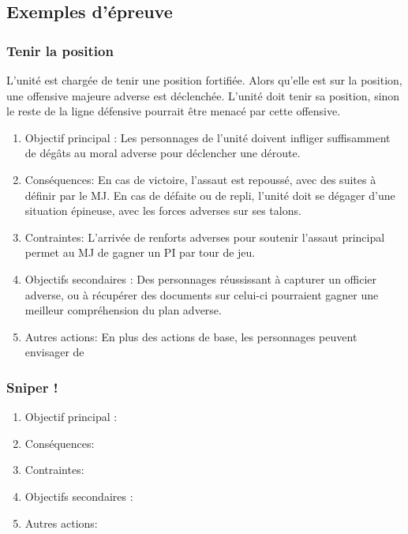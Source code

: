 \documentclass[twocolumn]{report}
\begin{document}
\subsection{Exemples d'épreuve}
\subsubsection{Tenir la position}
L'unité est chargée de tenir une position fortifiée. Alors qu'elle est sur la position, une offensive majeure adverse est déclenchée. L'unité doit tenir sa position, sinon le reste de la ligne défensive pourrait être menacé par cette offensive.
\begin{enumerate}
    \item Objectif principal : Les personnages de l'unité doivent infliger suffisamment de dégâts au moral adverse pour déclencher une déroute. 
    \item Conséquences: En cas de victoire, l'assaut est repoussé, avec des suites à définir par le MJ. En cas de défaite ou de repli, l'unité doit se dégager d'une situation épineuse, avec les forces adverses sur ses talons. 
    \item Contraintes: L'arrivée de renforts adverses pour soutenir l'assaut principal permet au MJ de gagner un PI par tour de jeu.
    \item Objectifs secondaires : Des personnages réussissant à capturer un officier adverse, ou à récupérer des documents sur celui-ci pourraient gagner une meilleur compréhension du plan adverse. %
    \item Autres actions: En plus des actions de base, les personnages peuvent envisager de %
\end{enumerate}
\subsubsection{Sniper !}
\begin{enumerate}
    \item Objectif principal :
    \item Conséquences:
    \item Contraintes:
    \item Objectifs secondaires :
    \item Autres actions:
\end{enumerate}
\end{document}
